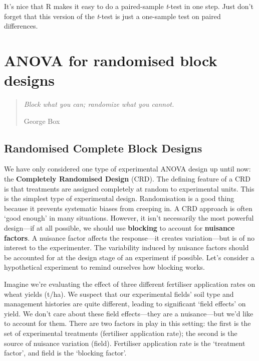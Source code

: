 \documentclass[
]{book}
\begin{document}
It's nice that R makes it easy to do a paired-sample \emph{t}-test in one step. Just don't forget that this version of the \emph{t}-test is just a one-sample test on paired differences.

\hypertarget{anova-for-randomised-block-designs}{%
\chapter{ANOVA for randomised block designs}\label{anova-for-randomised-block-designs}}

\begin{quote}
\emph{Block what you can; randomize what you cannot.}

George Box
\end{quote}

\hypertarget{randomised-complete-block-designs}{%
\section{Randomised Complete Block Designs}\label{randomised-complete-block-designs}}

We have only considered one type of experimental ANOVA design up until now: the \textbf{Completely Randomised Design} (CRD). The defining feature of a CRD is that treatments are assigned completely at random to experimental units. This is the simplest type of experimental design. Randomisation is a good thing because it prevents systematic biases from creeping in. A CRD approach is often `good enough' in many situations. However, it isn't necessarily the most powerful design---if at all possible, we should use \textbf{blocking} to account for \textbf{nuisance factors}. A nuisance factor affects the response---it creates variation---but is of no interest to the experimenter. The variability induced by nuisance factors should be accounted for at the design stage of an experiment if possible. Let's consider a hypothetical experiment to remind ourselves how blocking works.

Imagine we're evaluating the effect of three different fertiliser application rates on wheat yields (t/ha). We suspect that our experimental fields' soil type and management histories are quite different, leading to significant `field effects' on yield. We don't care about these field effects---they are a nuisance---but we'd like to account for them. There are two factors in play in this setting: the first is the set of experimental treatments (fertiliser application rate); the second is the source of nuisance variation (field). Fertiliser application rate is the `treatment factor', and field is the `blocking factor'.
\end{document}
